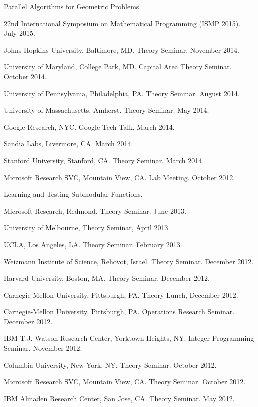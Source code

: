 \documentclass[11pt]{article}
\newenvironment{innerlist}[1][\enskip\textbullet]%
        {\begin{compactitem}[#1]}{\end{compactitem}}
\begin{document}
\begin{innerlist}
\item Parallel Algorithms for Geometric Problems
\begin{innerlist}
\item 22nd International Symposium on Mathematical Programming (ISMP 2015). July 2015.
\item Johns Hopkins University, Baltimore, MD. Theory Seminar. November 2014.
\item University of Maryland, College Park, MD. Capital Area Theory Seminar. October 2014.
\item University of Pennsylvania, Philadelphia, PA. Theory Seminar. August 2014.
\item University of Massachusetts, Amherst. Theory Seminar. May 2014.
\item Google Research, NYC. Google Tech Talk. March 2014.
\item Sandia Labs, Livermore, CA. March 2014.
\item Stanford University, Stanford, CA. Theory Seminar. March 2014.
\item Microsoft Research SVC, Mountain View, CA. Lab Meeting. October 2012.
\end{innerlist}

\item Learning and Testing Submodular Functions.
\begin{innerlist}
  \item Microsoft Research, Redmond. Theory Seminar. June 2013.
  \item University of Melbourne, Theory Seminar, April 2013.
  \item UCLA, Los Angeles, LA. Theory Seminar. February 2013.
  \item Weizmann Institute of Science, Rehovot, Israel. Theory Seminar. December 2012.  
  \item Harvard University, Boston, MA. Theory Seminar. December 2012.
  \item Carnegie-Mellon University, Pittsburgh, PA. Theory Lunch, December 2012.
  \item Carnegie-Mellon University, Pittsburgh, PA. Operations Research Seminar. December 2012.
  \item IBM T.J. Watson Research Center, Yorktown Heights, NY. Integer Programming Seminar. November 2012.
  \item Columbia University, New York, NY. Theory Seminar. October 2012.
  \item Microsoft Research SVC, Mountain View, CA. Theory Seminar. October 2012.
  \item IBM Almaden Research Center, San Jose, CA. Theory Seminar. May 2012.
\end{innerlist}


\end{innerlist}
\end{document}
